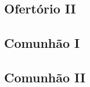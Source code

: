 \AllowPageFlush

\subsection{Ofertório II}\label{subsection:communia/commune-sanctarum/offertorium-2}

\AllowPageFlush

\subsection{Comunhão I}\label{subsection:communia/commune-sanctarum/communio-1}

\AllowPageFlush

\subsection{Comunhão II}\label{subsection:communia/commune-sanctarum/communio-2}
